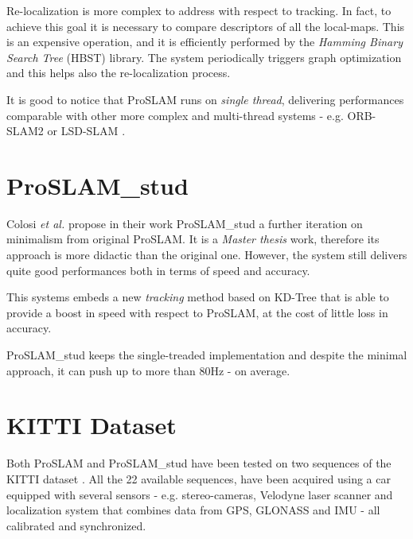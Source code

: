Re-localization is more complex to address with respect to tracking. In fact, to achieve this goal it is necessary to compare descriptors of all the local-maps. This is an expensive operation, and it is efficiently performed by the \textit{Hamming Binary Search Tree} (HBST) \cite{schlegel2016hbst} library. The system periodically triggers graph optimization and this helps also the re-localization process.

It is good to notice that ProSLAM runs on \textit{single thread}, delivering performances comparable with other more complex and multi-thread systems - e.g. ORB-SLAM2 \cite{mur2017orb-slam2} or LSD-SLAM \cite{engel2014lsd-slam}.

\section{ProSLAM\_stud}\label{sec:froslam}
Colosi \textit{et al.} propose in their work ProSLAM\_stud \cite{colosi2017froslam} a further iteration on minimalism from original ProSLAM. It is a \textit{Master thesis} work, therefore its approach is more didactic than the original one. However, the system still delivers quite good performances both in terms of speed and accuracy. 

This systems embeds a new \textit{tracking} method based on KD-Tree that is able to provide a boost in speed with respect to ProSLAM, at the cost of little loss in accuracy.

ProSLAM\_stud keeps the single-treaded implementation and despite the minimal approach, it can push up to more than 80Hz - on average.

\section{KITTI Dataset}\label{sec:kitti}
Both ProSLAM and ProSLAM\_stud have been tested on two sequences of the KITTI dataset \cite{geiger2012kitti}. All the 22 available sequences, have been acquired using a car equipped with several sensors - e.g. stereo-cameras, Velodyne laser scanner and localization system that combines data from GPS, GLONASS and IMU - all calibrated and synchronized. 

